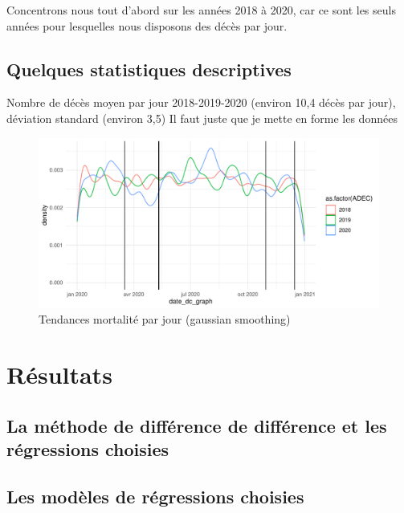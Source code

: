 \documentclass{article}
\begin{document}
Concentrons nous tout d'abord sur les années 2018 à 2020, car ce sont les seuls années pour lesquelles nous disposons des décès par jour. 












\subsection{Quelques statistiques descriptives}


Nombre de décès moyen par jour 2018-2019-2020 (environ 10,4 décès par jour), déviation standard (environ 3,5)
Il faut juste que je mette en forme les données


\begin{center}
\begin{figure}[h!]
\caption{\label{Graph_descr}Tendances mortalité par jour (gaussian smoothing)}
\includegraphics{Aussant_Forcadell_Sessego-003}
\end{figure}
\end{center}








\section{Résultats}

\subsection{La méthode de différence de différence et les régressions choisies}


\subsection{Les modèles de régressions choisies}
\end{document}
